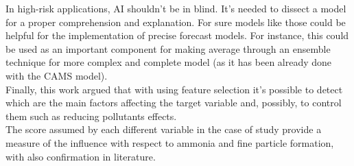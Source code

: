 In high-risk applications, AI shouldn't be in blind. 
It's needed to dissect a model for a proper comprehension and explanation.
For sure models like those could be helpful for the implementation of precise forecast models.  
For instance, this could be used as an important component for making average through an ensemble technique for more complex and complete model (as it has been already done with the CAMS model).
\\
Finally, this work argued that with using feature selection it's possible to detect which are the main factors affecting the target variable and, possibly, to control them such as reducing pollutants effects.\\
The score assumed by each different variable in the case of study provide a measure of the influence with respect to ammonia and fine particle formation, with also confirmation in literature.
\begin{comment}
Looking forward, further attempts for reducing pollutant formation should be made by procedures actually used.
\end{comment}
